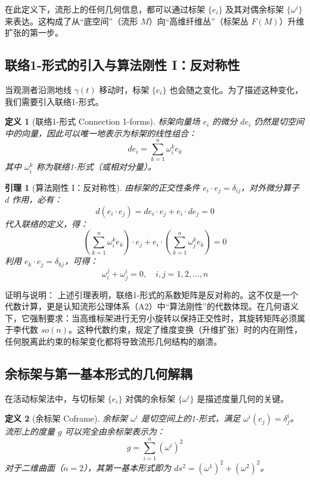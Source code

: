 \documentclass[11pt,a4paper]{article}
\newtheorem{definition}{定义}
\newtheorem{lemma}{引理}
\begin{document}
在此定义下，流形上的任何几何信息，都可以通过标架 \(\{e_i\}\) 及其对偶余标架 \(\{\omega^i\}\) 来表达。这构成了从“底空间”（流形 \(M\)）向“高维纤维丛”（标架丛 \(F(M)\)）升维扩张的第一步。

\subsection{联络1-形式的引入与算法刚性 I：反对称性}
当观测者沿测地线 \(\gamma(t)\) 移动时，标架 \(\{e_i\}\) 也会随之变化。为了描述这种变化，我们需要引入联络1-形式。

\begin{definition}[联络1-形式 Connection 1-forms]
标架向量场 \(e_i\) 的微分 \(de_i\) 仍然是切空间中的向量，因此可以唯一地表示为标架的线性组合：
\[
de_i=\sum_{k=1}^n \omega_i^k e_k
\]
其中 \(\omega_i^k\) 称为联络1-形式（或相对分量）。
\end{definition}

\begin{lemma}[算法刚性 I：反对称性]
由标架的正交性条件 \(e_i\cdot e_j=\delta_{ij}\)，对外微分算子 \(d\) 作用，必有：
\[
d(e_i\cdot e_j)=de_i\cdot e_j+e_i\cdot de_j=0
\]
代入联络的定义，得：
\[
\left(\sum_{k=1}^n \omega_i^k e_k\right)\cdot e_j+e_i\cdot\left(\sum_{k=1}^n \omega_j^k e_k\right)=0
\]
利用 \(e_k\cdot e_j=\delta_{kj}\)，可得：
\[
\omega_i^j+\omega_j^i=0,\quad i,j=1,2,\dots,n
\]
\end{lemma}

证明与说明：
上述引理表明，联络1-形式的系数矩阵是反对称的。这不仅是一个代数计算，更是认知流形公理体系（A2）中“算法刚性”的代数体现。在几何语义下，它强制要求：当高维标架进行无穷小旋转以保持正交性时，其旋转矩阵必须属于李代数 \(so(n)\)。这种代数约束，规定了维度变换（升维扩张）时的内在刚性，任何脱离此约束的标架变化都将导致流形几何结构的崩溃。

\subsection{余标架与第一基本形式的几何解耦}
在活动标架法中，与切标架 \(\{e_i\}\) 对偶的余标架 \(\{\omega^i\}\) 是描述度量几何的关键。

\begin{definition}[余标架 Coframe]
余标架 \(\omega^i\) 是切空间上的1-形式，满足 \(\omega^i(e_j)=\delta_j^i\)。流形上的度量 \(g\) 可以完全由余标架表示为：
\[
g=\sum_{i=1}^n (\omega^i)^2
\]
对于二维曲面（\(n=2\)），其第一基本形式即为 \(ds^2=(\omega^1)^2+(\omega^2)^2\)。
\end{definition}
\end{document}
